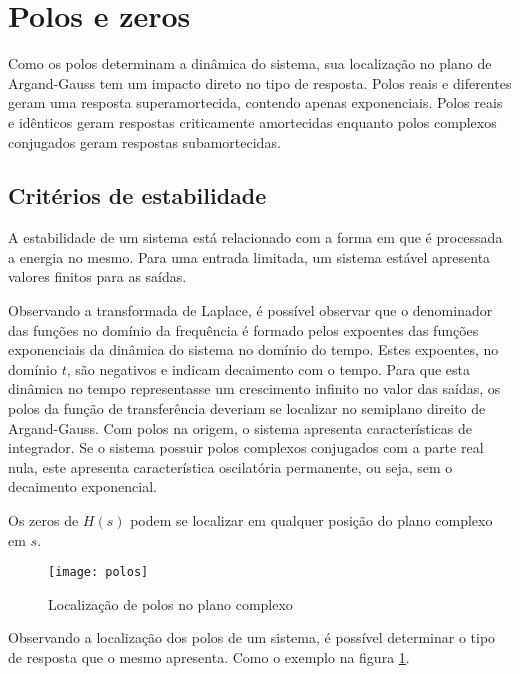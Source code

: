\documentclass[12pt,fleqn]{book} %
\begin{document}
    \section{Polos e zeros}{

Como os polos determinam a dinâmica do sistema, sua localização no plano de Argand-Gauss tem um impacto direto no tipo de resposta. Polos reais e diferentes geram uma resposta superamortecida, contendo apenas exponenciais. Polos reais e idênticos geram respostas criticamente amortecidas enquanto polos complexos conjugados geram respostas subamortecidas.
    
        \subsection{Critérios de estabilidade}{

A estabilidade de um sistema está relacionado com a forma em que é processada a energia no mesmo. Para uma entrada limitada, um sistema estável apresenta valores finitos para as saídas.

Observando a transformada de Laplace, é possível observar que o denominador das funções no domínio da frequência é formado pelos expoentes das funções exponenciais da dinâmica do sistema no domínio do tempo. Estes expoentes, no domínio $t$, são negativos e indicam decaimento com o tempo. Para que esta dinâmica no tempo representasse um crescimento infinito no valor das saídas, os polos da função de transferência deveriam se localizar no semiplano direito de Argand-Gauss. Com polos na origem, o sistema apresenta características de integrador. Se o sistema possuir polos complexos conjugados com a parte real nula, este apresenta característica oscilatória permanente, ou seja, sem o decaimento exponencial.

\begin{remark}
Os zeros de $H(s)$ podem se localizar em qualquer posição do plano complexo em $s$.
\end{remark}

}

             \begin{figure}[!htbp]
	              \centering\texttt{[image: polos]}
	              \caption{Localização de polos no plano complexo}\label{polos}
	          \end{figure}

Observando a localização dos polos de um sistema, é possível determinar o tipo de resposta que o mesmo apresenta. Como o exemplo na figura \ref{polos}.

}
\end{document}
